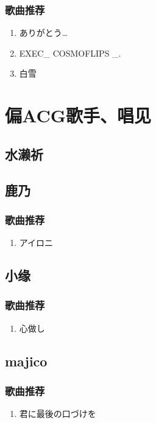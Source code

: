 \documentclass{ctexart}
\begin{document}
\subsubsection*{歌曲推荐}
\begin{enumerate}
\item ありがとう…
\item EXEC\_ COSMOFLIPS \_.
\item 白雪
\end{enumerate}

\section{偏ACG歌手、唱见}
\subsection{水濑祈}
\subsection{鹿乃}
\subsubsection*{歌曲推荐}
\begin{enumerate}
\item アイロニ
\end{enumerate}
\subsection{小缘}
\subsubsection*{歌曲推荐}
\begin{enumerate}
\item 心做し
\end{enumerate}
\subsection{majico}
\subsubsection*{歌曲推荐}
\begin{enumerate}
\item 君に最後の口づけを
\end{enumerate}
\end{document}
